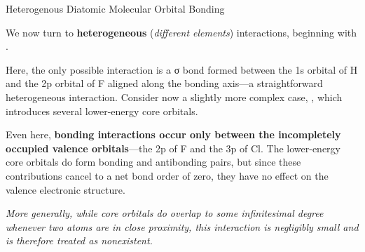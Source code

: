 \documentclass[10pt]{article}
\begin{document}
    \begin{core}{Heterogenous Diatomic Molecular Orbital Bonding}

      We now turn to \textbf{heterogeneous} (\textit{different elements}) interactions, beginning with .


      Here, the only possible interaction is a σ bond formed between the 1s orbital of H and the 2p orbital of F aligned along the bonding axis---a straightforward heterogeneous interaction. Consider now a slightly more complex case, , which introduces several lower-energy core orbitals.


      Even here, \textbf{bonding interactions occur only between the incompletely occupied valence orbitals}---the 2p of F and the 3p of Cl. The lower-energy core orbitals do form bonding and antibonding pairs, but since these contributions cancel to a net bond order of zero, they have no effect on the valence electronic structure.

      \textit{More generally, while core orbitals do overlap to some infinitesimal degree whenever two atoms are in close proximity, this interaction is negligibly small and is therefore treated as nonexistent.}

    \end{core} 
\end{document}
